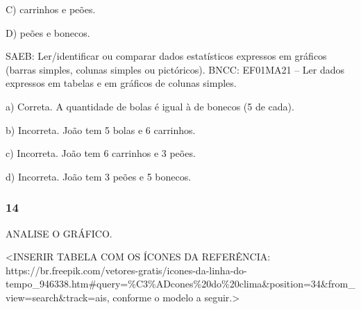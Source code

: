 C) carrinhos e peões.

D) peões e bonecos.

SAEB: Ler/identificar ou comparar dados estatísticos expressos
em gráficos (barras simples, colunas simples ou pictóricos).
BNCC: EF01MA21 -- Ler dados expressos em tabelas e em gráficos de colunas
simples.

a) Correta. A quantidade de bolas é igual à de bonecos (5 de cada).

b) Incorreta. João tem 5 bolas e 6 carrinhos.

c) Incorreta. João tem 6 carrinhos e 3 peões.

d) Incorreta. João tem 3 peões e 5 bonecos.

\subsubsection{14}\label{section-115}

ANALISE O GRÁFICO.

\textless{}INSERIR TABELA COM OS ÍCONES DA REFERÊNCIA:
https://br.freepik.com/vetores-gratis/icones-da-linha-do-tempo\_946338.htm\#query=\%C3\%ADcones\%20do\%20clima\&position=34\&from\_view=search\&track=ais,
conforme o modelo a seguir.\textgreater{}

